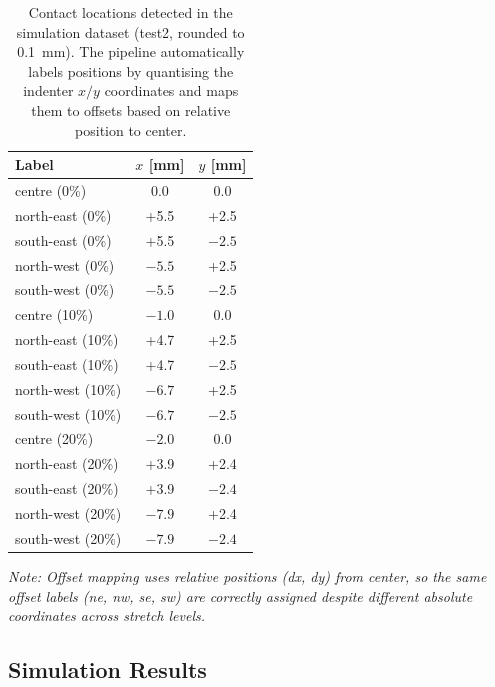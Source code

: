 \documentclass[11pt,a4paper]{article}
\begin{document}
\begin{table}[H]
    \centering
    \caption{Contact locations detected in the simulation dataset (test2, rounded to 0.1~mm). The pipeline
             automatically labels positions by quantising the indenter \(x/y\) coordinates and maps them to offsets based on relative position to center.}
    \label{tab:sim-positions}
    \begin{tabular}{@{}lcc@{}}
        \toprule
        Label & $x$ [mm] & $y$ [mm] \\
        \midrule
        centre (0\%) & 0.0 & 0.0 \\
        north-east (0\%) & +5.5 & +2.5 \\
        south-east (0\%) & +5.5 & $-2.5$ \\
        north-west (0\%) & $-5.5$ & +2.5 \\
        south-west (0\%) & $-5.5$ & $-2.5$ \\
        centre (10\%) & $-1.0$ & 0.0 \\
        north-east (10\%) & +4.7 & +2.5 \\
        south-east (10\%) & +4.7 & $-2.5$ \\
        north-west (10\%) & $-6.7$ & +2.5 \\
        south-west (10\%) & $-6.7$ & $-2.5$ \\
        centre (20\%) & $-2.0$ & 0.0 \\
        north-east (20\%) & +3.9 & +2.4 \\
        south-east (20\%) & +3.9 & $-2.4$ \\
        north-west (20\%) & $-7.9$ & +2.4 \\
        south-west (20\%) & $-7.9$ & $-2.4$ \\
        \bottomrule
    \end{tabular}
    \vspace{0.1cm}
    \footnotesize
    \textit{Note: Offset mapping uses relative positions (dx, dy) from center, so the same offset labels (ne, nw, se, sw) are correctly assigned despite different absolute coordinates across stretch levels.}
\end{table}

\subsection{Simulation Results}
\end{document}
